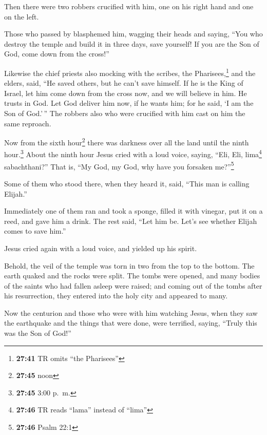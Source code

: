  Then there were two robbers crucified with him, one on
his right hand and one on the left.

 Those who passed by blasphemed him, wagging their heads
 and saying, ``You who destroy the temple and build it in
three days, save yourself! If you are the Son of God, come down from the
cross!''

 Likewise the chief priests also mocking with the
scribes, the Pharisees,\footnote{\textbf{27:41} TR omits ``the
  Pharisees''} and the elders, said,  ``He saved others,
but he can't save himself. If he is the King of Israel, let him come
down from the cross now, and we will believe in him.  He
trusts in God. Let God deliver him now, if he wants him; for he said, `I
am the Son of God.'\,''  The robbers also who were
crucified with him cast on him the same reproach.

 Now from the sixth hour\footnote{\textbf{27:45} noon}
there was darkness over all the land until the ninth hour.\footnote{\textbf{27:45}
  3:00 p.~m.}  About the ninth hour Jesus cried with a
loud voice, saying, ``Eli, Eli, lima\footnote{\textbf{27:46} TR reads
  ``lama'' instead of ``lima''} sabachthani?'' That is, ``My God, my
God, why have you forsaken me?''\footnote{\textbf{27:46} Psalm 22:1}

 Some of them who stood there, when they heard it, said,
``This man is calling Elijah.''

 Immediately one of them ran and took a sponge, filled it
with vinegar, put it on a reed, and gave him a drink. 
The rest said, ``Let him be. Let's see whether Elijah comes to save
him.''

 Jesus cried again with a loud voice, and yielded up his
spirit.

 Behold, the veil of the temple was torn in two from the
top to the bottom. The earth quaked and the rocks were split.
 The tombs were opened, and many bodies of the saints who
had fallen asleep were raised;  and coming out of the
tombs after his resurrection, they entered into the holy city and
appeared to many.

 Now the centurion and those who were with him watching
Jesus, when they saw the earthquake and the things that were done, were
terrified, saying, ``Truly this was the Son of God!''

